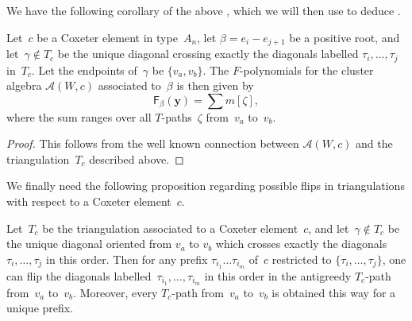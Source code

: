 \documentclass[10pt]{amsart}
\theoremstyle{definition}\newtheorem{rema}[theo]{Remark}\newtheorem{exem}[theo]{Example}
\newcommand{\y}{\mathbf{y}}
\newcommand{\Alg}{\mathcal{A}}
\newcommand{\Fpoly}[2]{{\mathsf{F}_{#1}(#2)}}
\begin{document}
We have the following corollary of the above , which we will then use to deduce .

\begin{coro}\label{cor:TpathAn}
Let~$c$ be a Coxeter element in type~$A_n$, let $\beta = e_i - e_{j+1}$ be a positive root, and let~$\gamma \notin T_c$ be the unique diagonal crossing exactly the diagonals labelled $\tau_i,\dots,\tau_j$ in~$T_c$. Let the endpoints of~$\gamma$ be $\{v_a,v_b\}$. The $F$-polynomials for the cluster algebra $\Alg(W,c)$ associated to~$\beta$ is then given by
\[
\Fpoly{\beta}{\y} = \sum m[\zeta],
\]
where the sum ranges over all $T$-paths~$\zeta$ from~$v_a$ to~$v_b$.
\end{coro}

\begin{proof}
This follows from the well known connection between $\Alg(W,c)$ and the triangulation~$T_c$ described above.
\end{proof}
We finally need the following proposition regarding possible flips in triangulations with respect to a Coxeter element~$c$.

\begin{prop}\label{prop:greedytpath}
Let~$T_c$ be the triangulation associated to a Coxeter element~$c$, and let~$\gamma\notin T_c$ be the unique diagonal oriented from $v_a$ to $v_b$ which crosses exactly the diagonals $\tau_i,\dots,\tau_j$ in this order. Then for any prefix $\tau_{i_1} \dots \tau_{i_m}$ of~$c$ restricted to $\{\tau_i,\dots,\tau_{j}\}$, one can flip the diagonals labelled~$\tau_{i_1},\dots,\tau_{i_m}$ in this order in the antigreedy $T_c$-path from~$v_a$ to~$v_b$. Moreover, every $T_c$-path from~$v_a$ to~$v_b$ is obtained this way for a unique prefix.
\end{prop}
\end{document}
